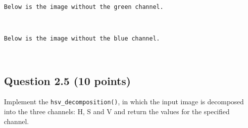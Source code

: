 \documentclass[11pt]{article}
\begin{document}
    \begin{center}
    \end{center}
    { \hspace*{\fill} \\}
    
    \begin{Verbatim}[commandchars=\\\{\}]
Below is the image without the green channel.

    \end{Verbatim}

    \begin{center}
    \end{center}
    { \hspace*{\fill} \\}
    
    \begin{Verbatim}[commandchars=\\\{\}]
Below is the image without the blue channel.

    \end{Verbatim}

    \begin{center}
    \end{center}
    { \hspace*{\fill} \\}
    
    \subsection{Question 2.5 (10 points)}\label{question-2.5-10-points}

Implement the \texttt{hsv\_decomposition()}, in which the input image is
decomposed into the three channels: H, S and V and return the values for
the specified channel.
\end{document}
